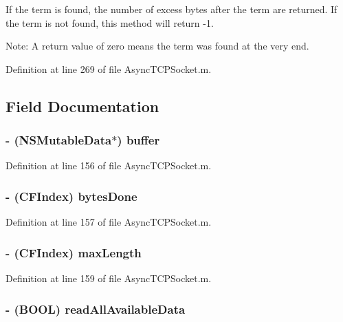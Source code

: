 If the term is found, the number of excess bytes after the term are returned. If the term is not found, this method will return -\/1.

Note: A return value of zero means the term was found at the very end. 

Definition at line 269 of file AsyncTCPSocket.m.



\subsection{Field Documentation}
\hypertarget{interface_async_read_packet_a7ab0bf89e1cb8317d120c9c44ab611f0}{
\subsubsection[{buffer}]{\setlength{\rightskip}{0pt plus 5cm}-\/ (NSMutableData$\ast$) {\bf buffer}}}
\label{interface_async_read_packet_a7ab0bf89e1cb8317d120c9c44ab611f0}


Definition at line 156 of file AsyncTCPSocket.m.

\hypertarget{interface_async_read_packet_a804028456a90dacc02875cce444fc633}{
\subsubsection[{bytesDone}]{\setlength{\rightskip}{0pt plus 5cm}-\/ (CFIndex) {\bf bytesDone}}}
\label{interface_async_read_packet_a804028456a90dacc02875cce444fc633}


Definition at line 157 of file AsyncTCPSocket.m.

\hypertarget{interface_async_read_packet_af40e9808177892b59a4da837758cbd46}{
\subsubsection[{maxLength}]{\setlength{\rightskip}{0pt plus 5cm}-\/ (CFIndex) {\bf maxLength}}}
\label{interface_async_read_packet_af40e9808177892b59a4da837758cbd46}


Definition at line 159 of file AsyncTCPSocket.m.

\hypertarget{interface_async_read_packet_aa5c1fe7301afb88f18c0330044951924}{
\subsubsection[{readAllAvailableData}]{\setlength{\rightskip}{0pt plus 5cm}-\/ (BOOL) {\bf readAllAvailableData}}}
\label{interface_async_read_packet_aa5c1fe7301afb88f18c0330044951924}


